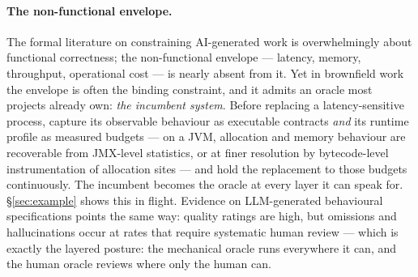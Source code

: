 \documentclass[11pt,a4paper,twocolumn]{article}
\begin{document}
\paragraph{The non-functional envelope.} The formal literature on
constraining AI-generated work is overwhelmingly about functional
correctness; the non-functional envelope --- latency, memory,
throughput, operational cost --- is nearly absent from it. Yet in
brownfield work the envelope is often the binding constraint, and
it admits an oracle most projects already own: \emph{the incumbent
system}. Before replacing a latency-sensitive process, capture its
observable behaviour as executable contracts \emph{and} its
runtime profile as measured budgets --- on a JVM, allocation and
memory behaviour are recoverable from JMX-level statistics, or at
finer resolution by bytecode-level instrumentation of allocation
sites --- and hold the replacement to those budgets continuously.
The incumbent becomes the oracle at every layer it can speak for.
\S\ref{sec:example} shows this in flight. Evidence on
LLM-generated behavioural specifications points the same way:
quality ratings are high, but omissions and hallucinations occur
at rates that require systematic human review
\citep{hassani2025gherkin} --- which is exactly the layered
posture: the mechanical oracle runs everywhere it can, and the
human oracle reviews where only the human can.
\end{document}
